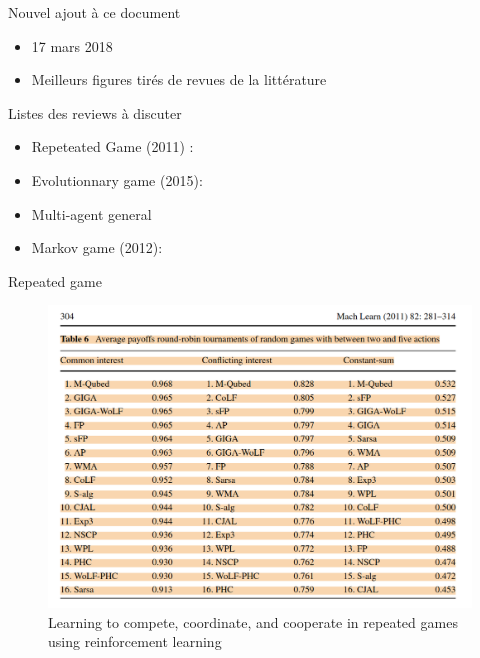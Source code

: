 \documentclass[aspectratio=169,xcolor=dvipsnames]{beamer}
\begin{document}
\begin{frame}{Nouvel ajout à ce document}
\begin{itemize}
    \item 17 mars 2018
    \item Meilleurs figures tirés de revues de la littérature
\end{itemize}
\end{frame}

\begin{frame}{Listes des reviews à discuter}
\begin{itemize}
    \item Repeteated Game (2011) : \citet{crandall_learning_2011}
    \item Evolutionnary game (2015):
    \citet{bloembergen_evolutionary_2015}
    \item Multi-agent general \cite{hernandez-leal_survey_2019}
    \item Markov game (2012): \citet{matignon_independent_2012}
\end{itemize}
\end{frame}

\begin{frame}{Repeated game}

  \begin{figure}
    \centering
    \includegraphics[scale=0.20]{round-robin tournaments.png}
    \caption{\citet{crandall_learning_2011} Learning to compete, coordinate, and
cooperate in repeated games using reinforcement learning}
  \end{figure}
\end{frame}
\end{document}
